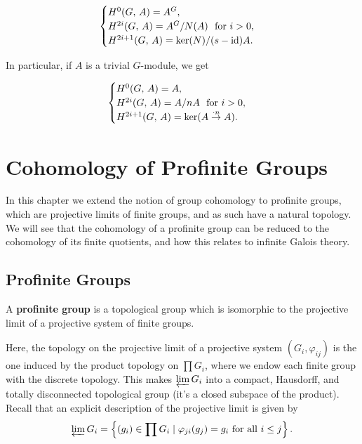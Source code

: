 \documentclass[a4paper, oneside]{memoir}
\begin{document}
\begin{equation}\label{eq:CycCohom}
	\begin{cases}
		H^{0}( G, \, A )= A^G,                          \\
		H^{2i}( G, \, A ) = A^G/N(A) ~\text{ for } i>0, \\
		H^{2i+1}( G, \, A ) = \ker(N)/(s-\operatorname{id})A.
	\end{cases}
\end{equation}

In particular, if $A$ is a trivial $G$-module, we get

\begin{equation}\label{eq:CycCohomTriv}
	\begin{cases}
		H^{0}( G, \, A ) = A,                       \\
		H^{2i}( G, \, A ) = A/nA ~\text{ for } i>0, \\
		H^{2i+1}( G, \, A ) = \ker(A\overset{\cdot n}{\to} A).
	\end{cases}
\end{equation}

\chapter{Cohomology of Profinite Groups}

In this chapter we extend the notion of group cohomology to profinite groups, which are projective limits of finite groups, and as such have a natural topology. We will see that the cohomology of a profinite group can be reduced to the cohomology of its finite quotients, and how this relates to infinite Galois theory.

\section{Profinite Groups}
\begin{definition}
	A \textbf{profinite group} is a topological group which is isomorphic to the projective limit of a projective system of finite groups.
\end{definition}

Here, the topology on the projective limit of a projective system $(G_i,\varphi_{ij})$ is the one induced by the product topology on $\prod{G_i}$, where we endow each finite group with the discrete topology. This makes $\varprojlim{G_i}$ into a compact, Hausdorff, and totally disconnected topological group (it's a closed subspace of the product). Recall that an explicit description of the projective limit is given by
\[
	\varprojlim{G_i} = \left\{ (g_i) \in \prod{G_i} \mid \varphi_{ji}(g_j)=g_i \text{ for all } i\leq j \right\}.
\]
\end{document}

